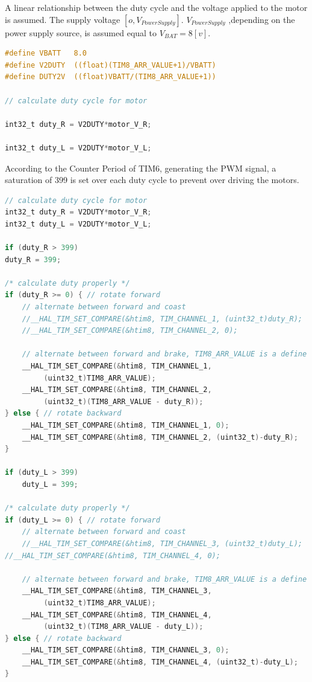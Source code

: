 \documentclass[english]{article}
\begin{document}
    A linear relationship between the duty cycle and
     the voltage applied to the motor is assumed. The supply voltage $[o, V_{PowerSupply}]$. $V_{PowerSupply}$ ,depending on the power supply source,
    is assumed equal to $V_{BAT} = 8[v]$.
\newpage
\begin{lstlisting}[language=C, caption={calculating duty cycle}, label={lst:duty} ]
#define VBATT	8.0 
#define V2DUTY	((float)(TIM8_ARR_VALUE+1)/VBATT) 
#define DUTY2V	((float)VBATT/(TIM8_ARR_VALUE+1)) 

// calculate duty cycle for motor 

int32_t duty_R = V2DUTY*motor_V_R; 

int32_t duty_L = V2DUTY*motor_V_L;   
\end{lstlisting}
According to the Counter Period of TIM6, generating the PWM signal,
a saturation of 399 is set over each duty cycle to prevent over driving the motors. 
\begin{lstlisting}[language=C, caption={calculating duty cycle and command the motors}, label={lst:duty1} ]
// calculate duty cycle for motor
int32_t duty_R = V2DUTY*motor_V_R;
int32_t duty_L = V2DUTY*motor_V_L;

if (duty_R > 399)
duty_R = 399;

/* calculate duty properly */
if (duty_R >= 0) { // rotate forward
    // alternate between forward and coast
    //__HAL_TIM_SET_COMPARE(&htim8, TIM_CHANNEL_1, (uint32_t)duty_R);
    //__HAL_TIM_SET_COMPARE(&htim8, TIM_CHANNEL_2, 0);

    // alternate between forward and brake, TIM8_ARR_VALUE is a define
    __HAL_TIM_SET_COMPARE(&htim8, TIM_CHANNEL_1,
         (uint32_t)TIM8_ARR_VALUE);
    __HAL_TIM_SET_COMPARE(&htim8, TIM_CHANNEL_2,
         (uint32_t)(TIM8_ARR_VALUE - duty_R));
} else { // rotate backward
    __HAL_TIM_SET_COMPARE(&htim8, TIM_CHANNEL_1, 0);
    __HAL_TIM_SET_COMPARE(&htim8, TIM_CHANNEL_2, (uint32_t)-duty_R);
}

if (duty_L > 399)
    duty_L = 399;

/* calculate duty properly */
if (duty_L >= 0) { // rotate forward
    // alternate between forward and coast
    //__HAL_TIM_SET_COMPARE(&htim8, TIM_CHANNEL_3, (uint32_t)duty_L);
//__HAL_TIM_SET_COMPARE(&htim8, TIM_CHANNEL_4, 0);

    // alternate between forward and brake, TIM8_ARR_VALUE is a define
    __HAL_TIM_SET_COMPARE(&htim8, TIM_CHANNEL_3,
         (uint32_t)TIM8_ARR_VALUE);
    __HAL_TIM_SET_COMPARE(&htim8, TIM_CHANNEL_4, 
         (uint32_t)(TIM8_ARR_VALUE - duty_L));
} else { // rotate backward
    __HAL_TIM_SET_COMPARE(&htim8, TIM_CHANNEL_3, 0);
    __HAL_TIM_SET_COMPARE(&htim8, TIM_CHANNEL_4, (uint32_t)-duty_L);
} 
\end{lstlisting}
\end{document}
